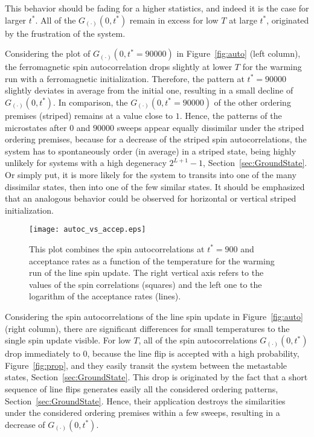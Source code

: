 This behavior should be fading for a higher statistics, 
and indeed it is the case for larger $t^*$. All of the $G_{(\cdot)}(0,t^*)$ remain in excess for low $T$ at large $t^*$, originated by the 
frustration of the system.

Considering the plot of $G_{(\cdot)}(0,t^*\!=\!90000)$ in Figure~\ref{fig:auto} (left column), the ferromagnetic spin 
autocorrelation drops slightly at lower $T$ for the warming run with a ferromagnetic initialization. Therefore, the pattern at $t^*\!=\!90000$ slightly 
deviates in average from the initial one, resulting in a small decline of $G_{(\cdot)}(0,t^*)$. In comparison, the $G_{(\cdot)}(0,t^*\!=\!90000)$ 
of the other ordering premises (striped) remains at a value close to $1$. Hence, the patterns of the microstates after $0$ and $90000$ sweeps appear equally 
dissimilar under the striped ordering premises, because for a decrease of the striped spin autocorrelations, the system has to spontaneously order 
(in average) in a striped state, being highly unlikely for systems with a high degeneracy $2^{L+1}\!-\!1$, Section~\ref{sec:GroundState}. Or simply put, 
it is more likely for the system to transits into one of the many dissimilar states, then into one of the few similar states. It should be emphasized that 
an analogous behavior could be observed for horizontal or vertical striped initialization. 
\\
\begin{figure}[!h]
  \texttt{[image: autoc\_vs\_accep.eps]}
  \caption{This plot combines the spin autocorrelations at $t^*\!=\!900$ and acceptance rates as a function of the temperature for the warming run of the 
           line spin update. The right vertical axis refers to the values of the spin correlations (squares) and the left one to the logarithm of the 
           acceptance rates (lines).}
  \label{fig:autoc_vs_accep}
\end{figure}

Considering the spin autocorrelations of the line spin update in Figure~\ref{fig:auto} (right column), there are significant differences for small temperatures 
to the single spin update visible. For low $T$, all of the spin autocorrelations $G_{(\cdot)}(0,t^*)$  drop immediately to $0$, because the line flip is accepted with a high 
probability, Figure~\ref{fig:prop}, and they easily transit the system between the metastable states, Section~\ref{sec:GroundState}. This drop is originated 
by the fact that a short sequence of line flips generates easily all the considered ordering patterns, 
Section~\ref{sec:GroundState}. Hence, their application  destroys the similarities under the considered ordering premises within a few sweeps, resulting in
a decrease of $G_{(\cdot)}(0,t^*)$. 

